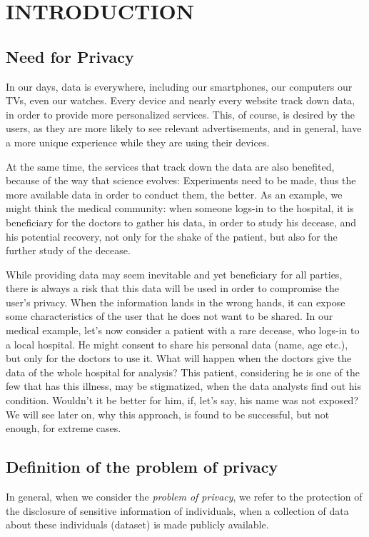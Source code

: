 \chapter{INTRODUCTION}

\section{Need for Privacy}


\par In our days, data is everywhere, including our smartphones, our computers our TVs, even our watches. Every device and nearly every website track down data, in order to provide more personalized services. This, of course, is desired by the users, as they are more likely to see relevant advertisements, and in general, have a more unique experience while they are using their devices.

\par At the same time, the services that track down the data are also benefited, because of the way that science evolves: Experiments need to be made, thus the more available data in order to conduct them, the better. As an example, we might think the medical community: when someone logs-in to the hospital, it is beneficiary for the doctors to gather his data, in order to study his decease, and his potential recovery, not only for the shake of the patient, but also for the further study of the decease. 

\par While providing data may seem inevitable and yet beneficiary for all parties, there is always a risk that this data will be used in order to compromise the user's privacy. When the information lands in the wrong hands, it can expose some characteristics of the user that he does not want to be shared. In our medical example, let's now consider a patient with a rare decease, who logs-in to a local hospital. He might consent to share his personal data (name, age etc.), but only for the doctors to use it. What will happen when the doctors give the data of the whole hospital for analysis? This patient, considering he is one of the few that has this illness, may be stigmatized,  when the data analysts find out his condition. Wouldn't it be better for him, if, let's say, his name was not exposed? We will see later on, why this approach, is found to be successful, but not enough, for extreme cases.

\section{Definition of the problem of privacy}
\par In general, when we consider the \emph{problem of privacy}, we refer to the protection of the disclosure of sensitive information of individuals, when a collection of data about these individuals (dataset) is made publicly available.


